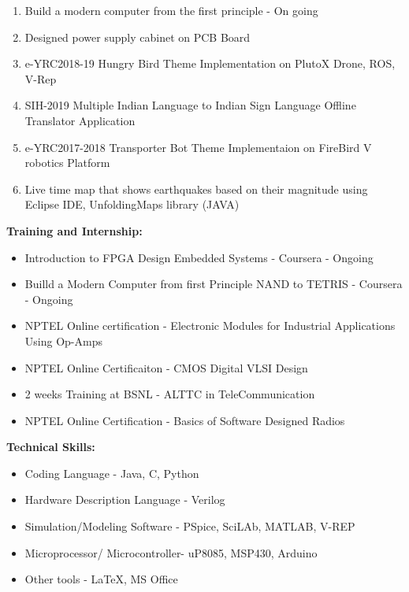 \documentclass {article}
\begin{document}
\large \begin{enumerate}
		\item Build a modern computer from the first principle - On going
		\item Designed power supply cabinet on PCB Board
		\item e-YRC2018-19 Hungry Bird Theme Implementation on PlutoX Drone, ROS, V-Rep 
		\item SIH-2019 Multiple Indian Language to Indian Sign Language Offline Translator Application
 		\item e-YRC2017-2018 Transporter Bot Theme Implementaion on FireBird V robotics Platform
		\item Live time map that shows earthquakes based on their magnitude using Eclipse IDE, UnfoldingMaps library (JAVA)\\
	\end{enumerate}
\begin {flushleft} \Large \textbf {Training and Internship:} \end{flushleft}
	\begin{itemize}
		\item Introduction to FPGA Design Embedded Systems - Coursera - Ongoing
		\item Builld a Modern Computer from first Principle NAND to TETRIS - Coursera - Ongoing
		\item NPTEL Online certification - Electronic Modules for Industrial Applications Using Op-Amps
		\item NPTEL Online Certificaiton - CMOS Digital VLSI Design
		\item 2 weeks Training at BSNL - ALTTC in TeleCommunication
		\item NPTEL Online Certification - Basics of Software Designed Radios	\\
	\end{itemize}
\newpage
\begin {flushleft} \Large \textbf {Technical Skills:} \end{flushleft}
	\begin {itemize}
		\item Coding Language - Java, C, Python
		\item Hardware Description Language - Verilog
		\item Simulation/Modeling Software - PSpice, SciLAb, MATLAB, V-REP
		\item Microprocessor/ Microcontroller- uP8085, MSP430, Arduino
		\item Other tools - LaTeX, MS Office
	\end {itemize}
\end{document}
